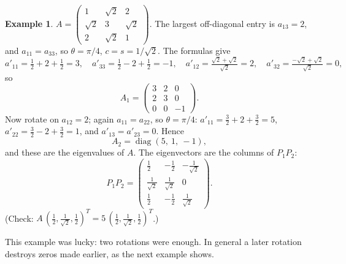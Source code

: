 \documentclass[11pt,a4paper]{article}
\theoremstyle{definition}
\newtheorem{example}{Example}
\theoremstyle{remark}
\begin{document}
\begin{example}\label{ex:nice}
$A=\begin{pmatrix}1&\sqrt2&2\\ \sqrt2&3&\sqrt2\\ 2&\sqrt2&1\end{pmatrix}$.
The largest off-diagonal entry is $a_{13}=2$, and $a_{11}=a_{33}$, so $\theta=\pi/4$, $c=s=1/\sqrt2$. The formulas give
\[
a'_{11}=\tfrac12+2+\tfrac12=3,\quad a'_{33}=\tfrac12-2+\tfrac12=-1,\quad
a'_{12}=\tfrac{\sqrt2+\sqrt2}{\sqrt2}=2,\quad a'_{32}=\tfrac{-\sqrt2+\sqrt2}{\sqrt2}=0,
\]
so
\[
A_1=\begin{pmatrix}3&2&0\\2&3&0\\0&0&-1\end{pmatrix}.
\]
Now rotate on $a_{12}=2$; again $a_{11}=a_{22}$, so $\theta=\pi/4$:
$a'_{11}=\tfrac32+2+\tfrac32=5$, $a'_{22}=\tfrac32-2+\tfrac32=1$, and $a'_{13}=a'_{23}=0$. Hence
\[
A_2=\operatorname{diag}(5,\ 1,\ -1),
\]
and these are the eigenvalues of $A$. The eigenvectors are the columns of $P_1P_2$:
\[
P_1P_2=\begin{pmatrix}\tfrac12&-\tfrac12&-\tfrac1{\sqrt2}\\[2pt] \tfrac1{\sqrt2}&\tfrac1{\sqrt2}&0\\[2pt] \tfrac12&-\tfrac12&\tfrac1{\sqrt2}\end{pmatrix}.
\]
(Check: $A\,(\tfrac12,\tfrac1{\sqrt2},\tfrac12)^T=5\,(\tfrac12,\tfrac1{\sqrt2},\tfrac12)^T$.)
\end{example}

This example was lucky: two rotations were enough. In general a later rotation destroys zeros made
earlier, as the next example shows.
\end{document}

